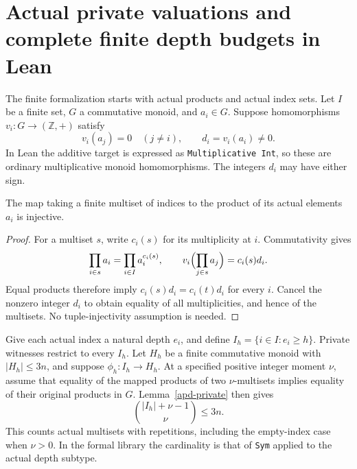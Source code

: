 \section{Actual private valuations and complete finite depth budgets in Lean}
\label{apd-section}

The finite formalization starts with actual products and actual index sets.
Let $I$ be a finite set, $G$ a commutative monoid, and $a_i\in G$.
Suppose homomorphisms $v_i:G\to(\mathbb Z,+)$ satisfy
\[
 v_i(a_j)=0\quad(j\ne i),\qquad d_i=v_i(a_i)\ne0.
\]
In Lean the additive target is expressed as
\texttt{Multiplicative Int}, so these are ordinary multiplicative
monoid homomorphisms. The integers $d_i$ may have either sign.

\begin{lemma}\label{apd-private}
The map taking a finite multiset of indices to the product of its
actual elements $a_i$ is injective.
\end{lemma}
\begin{proof}
For a multiset $s$, write $c_i(s)$ for its multiplicity at $i$.
Commutativity gives
\[
 \prod_{i\in s}a_i=\prod_{i\in I}a_i^{c_i(s)},\qquad
 v_i\Bigl(\prod_{j\in s}a_j\Bigr)=c_i(s)d_i.
\]
Equal products therefore imply $c_i(s)d_i=c_i(t)d_i$ for every $i$.
Cancel the nonzero integer $d_i$ to obtain equality of all multiplicities,
and hence of the multisets. No tuple-injectivity assumption is needed.
\end{proof}

Give each actual index a natural depth $e_i$, and define
$I_h=\{i\in I:e_i\ge h\}$. Private witnesses restrict to every $I_h$.
Let $H_h$ be a finite commutative monoid with $|H_h|\le3n$, and suppose
$\phi_h:I_h\to H_h$. At a specified positive integer moment $\nu$, assume that equality
of the mapped products of two $\nu$-multisets implies equality of
their original products in $G$. Lemma~\ref{apd-private} then gives
\begin{equation}\label{apd-count}
 \binom{|I_h|+\nu-1}{\nu}\le3n.
\end{equation}
This counts actual multisets with repetitions, including the empty-index
case when $\nu>0$. In the formal library the cardinality is that of
\texttt{Sym} applied to the actual depth subtype.

